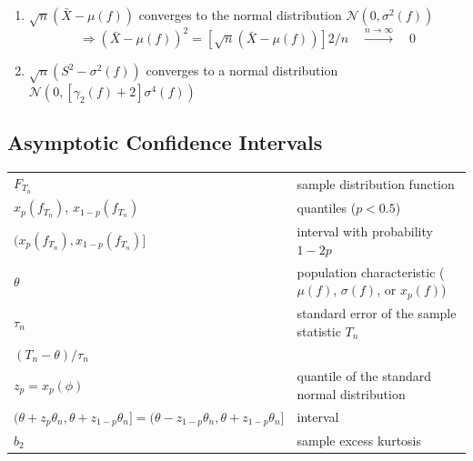 \begin{enumerate}
\begin{enumerate}
        \item $\sqrt{n}(\bar{X} - \mu( f ))$ converges to the normal distribution $\mathcal{N}(0, \sigma^2( f ))$
        \[
            \Rightarrow
            (\bar{X} - \mu( f ))^2 
            = [\sqrt{n}(\bar{X} - \mu( f ))]2/n 
            \quad
            \overset{n\to \infty}{\longrightarrow}
            \quad
            0
        \]

        \item $\sqrt{n}(S^2 - \sigma^2( f ))$ converges to a normal distribution $\mathcal{N}(0,[\gamma_2( f ) + 2]\sigma^4( f ))$
    \end{enumerate}

    
\end{enumerate}

\subsection{Asymptotic Confidence Intervals \cite{ism-1}} \label{sample statistic: Asymptotic Confidence Intervals}

\begin{customTableWrapper}{1.5}
\begin{longtable}[H]{l l}
    $F_{T_n}$ & sample distribution function \\

    $x_p( f_{T_n} )$, $x_{1-p}( f_{T_n} )$ & quantiles ($p < 0.5$)\\

    $(x_p( f_{T_n} ), x_{1-p}( f_{T_n} )]$ & interval with probability $1 - 2p$\\

    $\theta$ & population characteristic ($\mu( f )$, $\sigma ( f )$, or $x_p( f )$)\\

    $\tau_n$ & standard error of the sample statistic $T_n$ \\

    $(T_n - \theta )/\tau_n$ & \\

    $z_p = x_p (\phi)$ & quantile of the standard normal distribution\\

    $(\theta + z_p\theta_n, \theta + z_{1-p}\theta_n] = (\theta - z_{1-p}\theta_n, \theta + z_{1-p}\theta_n]$ & interval\\

    $b_2$ & sample excess kurtosis\\
\end{longtable}
\end{customTableWrapper}


